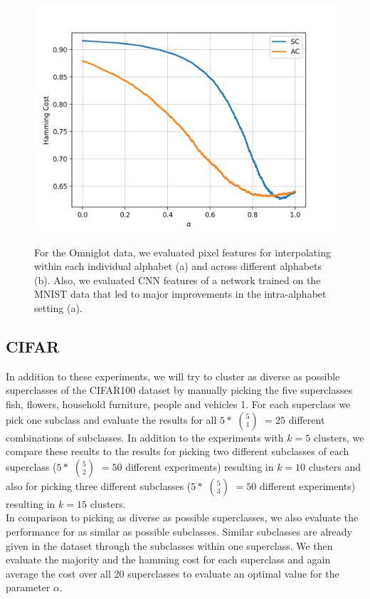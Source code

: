 \begin{figure}[H]
\begin{minipage}{.45\textwidth}
  {\includegraphics[width=\linewidth]{plots/omniglot_inter}}
\end{minipage}
\label{fig:omniglot_overview}
\caption{For the Omniglot data, we evaluated pixel features for interpolating within each individual alphabet (a) and across different alphabets (b). Also, we evaluated CNN features of a network trained on the MNIST data that led to major improvements in the intra-alphabet setting (a).}
\end{figure}

\subsection{CIFAR}

In addition to these experiments, we will try to cluster as diverse as possible superclasses of the CIFAR100 dataset by manually picking the five superclasses fish, flowers, household furniture, people and vehicles 1. For each superclass we pick one subclass and evaluate the results for all $5 *$ $5 \choose 1$ $= 25$ different combinations of subclasses. In addition to the experiments with $k = 5$ clusters, we compare these results to the results for picking two different subclasses of each superclass ($5 *$ $5 \choose 2$ $= 50$ different experiments) resulting in $k = 10$ clusters and also for picking three different subclasses ($5 *$ $5 \choose 3$ $= 50$ different experiments) resulting in $k = 15$ clusters.\\

In comparison to picking as diverse as possible superclasses, we also evaluate the performance for as similar as possible subclasses. Similar subclasses are already given in the dataset through the subclasses within one superclass. We then evaluate the majority and the hamming cost for each superclass and again average the cost over all 20 superclasses to evaluate an optimal value for the parameter $\alpha$.

